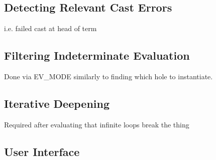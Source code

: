 \subsection{Detecting Relevant Cast Errors}
i.e. failed cast at head of term
\subsection{Filtering Indeterminate Evaluation}
Done via EV\_MODE similarly to finding which hole to instantiate.

\subsection{Iterative Deepening}\label{sec:IterativeDeepening}
Required after evaluating that infinite loops break the thing
\subsection{User Interface}


